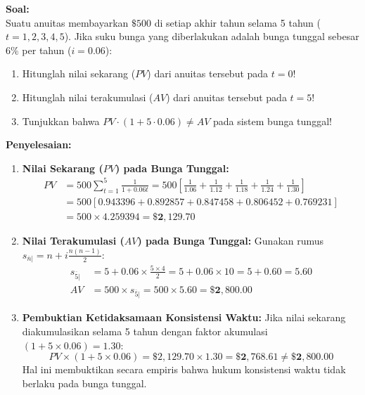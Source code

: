 \documentclass[11pt,a4paper]{article}
\begin{document}
\begin{examplebox}
\textbf{Soal:}\\
Suatu anuitas membayarkan $\$500$ di setiap akhir tahun selama 5 tahun ($t = 1, 2, 3, 4, 5$). Jika suku bunga yang diberlakukan adalah bunga tunggal sebesar $6\%$ per tahun ($i = 0.06$):
\begin{enumerate}[label=(\alph*)]
    \item Hitunglah nilai sekarang ($PV$) dari anuitas tersebut pada $t = 0$!
    \item Hitunglah nilai terakumulasi ($AV$) dari anuitas tersebut pada $t = 5$!
    \item Tunjukkan bahwa $PV \cdot (1 + 5 \cdot 0.06) \neq AV$ pada sistem bunga tunggal!
\end{enumerate}

\vspace{0.5em}
\textbf{Penyelesaian:}\\
\begin{enumerate}[label=(\alph*)]
    \item \textbf{Nilai Sekarang ($PV$) pada Bunga Tunggal:}
    \begin{align*}
        PV &= 500 \sum_{t=1}^5 \frac{1}{1 + 0.06t} = 500 \left[ \frac{1}{1.06} + \frac{1}{1.12} + \frac{1}{1.18} + \frac{1}{1.24} + \frac{1}{1.30} \right] \\[0.4em]
           &= 500 \left[ 0.943396 + 0.892857 + 0.847458 + 0.806452 + 0.769231 \right] \\[0.4em]
           &= 500 \times 4.259394 = \mathbf{\$2{,}129.70}
    \end{align*}

    \item \textbf{Nilai Terakumulasi ($AV$) pada Bunga Tunggal:}
    Gunakan rumus $s_{\overline{n}|} = n + i \frac{n(n-1)}{2}$:
    \begin{align*}
        s_{\overline{5}|} &= 5 + 0.06 \times \frac{5 \times 4}{2} = 5 + 0.06 \times 10 = 5 + 0.60 = 5.60 \\[0.4em]
        AV &= 500 \times s_{\overline{5}|} = 500 \times 5.60 = \mathbf{\$2{,}800.00}
    \end{align*}

    \item \textbf{Pembuktian Ketidaksamaan Konsistensi Waktu:}
    Jika nilai sekarang diakumulasikan selama 5 tahun dengan faktor akumulasi $(1 + 5 \times 0.06) = 1.30$:
    \begin{equation*}
        PV \times (1 + 5 \times 0.06) = \$2{,}129.70 \times 1.30 = \mathbf{\$2{,}768.61} \neq \mathbf{\$2{,}800.00}
    \end{equation*}
    Hal ini membuktikan secara empiris bahwa hukum konsistensi waktu tidak berlaku pada bunga tunggal.
\end{enumerate}
\end{examplebox}
\end{document}
